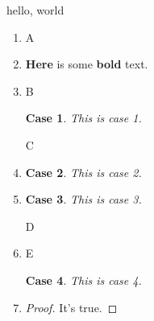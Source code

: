 \documentclass{amsart}
\newtheorem{case}{Case}
\begin{document}
hello, world

\begin{enumerate}

\item A

\item \textbf{Here} is some \textbf{bold} text.

\item B

\begin{case}
This is case 1.
\end{case}

C

\item \begin{case}This is case 2.\end{case}

\item \begin{case}This is case 3.\end{case}

D

\item E \begin{case}This is case 4.\end{case}

\item \begin{proof} It's true. \end{proof}

\end{enumerate}
\end{document}
